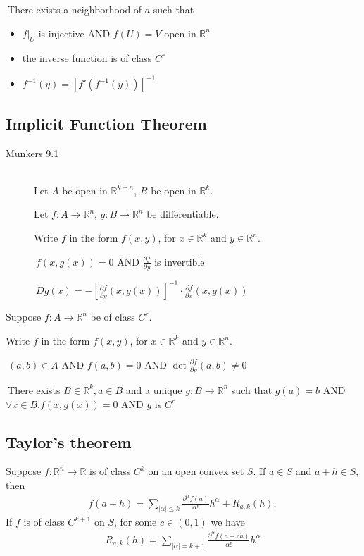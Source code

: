 \thmTHEN
	$\ $There exists a neighborhood of $a$ such that
\begin{itemize}
	\item $f|_U$ is injective AND $f(U)=V$ open in $\mathbb{R}^n$
	\item the inverse function is of class $C^r$
	\item $f^{-1}(y)=[f'(f^{-1}(y))]^{-1}$
\end{itemize}


\subsection{Implicit Function Theorem}
\label{thm_ipft}
\begin{description}
	\item[Munkers 9.1] \hfill \\
		Let $A$ be open in $\mathbb{R}^{k+n}$, $B$ be open in $\mathbb{R}^k$.

		Let $f:A\to \mathbb{R}^n$, $g:B\to \mathbb{R}^n$ be differentiable.

		Write $f$ in the form $f(x, y)$, for $x\in \mathbb{R}^k$ and $y\in \mathbb{R}^n$.

		\thmIF $\ f(x, g(x))=0$ AND $\frac{\partial f}{\partial y}$ is invertible

		\thmTHEN $\ Dg(x)=-\left[\frac{\partial f}{\partial y}(x,g(x))\right]^{-1}\cdot \frac{\partial f}{\partial x}(x,g(x))$
\end{description}

Suppose $f:A\to \mathbb{R}^n$ be of class $C^r$.

Write $f$ in the form $f(x, y)$, for $x\in \mathbb{R}^k$ and $y\in \mathbb{R}^n$.

\thmIF $\ (a, b)\in A$ AND $f(a, b)=0$ AND $\det \frac{\partial f}{\partial y}(a,b)\neq 0$

\thmTHEN $\ $There exists $B\in \mathbb{R}^k, a \in B$ and a unique $g:B\to \mathbb{R}^n$ such that
		$g(a)=b$ AND $\forall x\in B. f(x,g(x))=0$ AND $g$ is $C^r$

\subsection{Taylor’s theorem}
\label{thm:taylor}
Suppose $f:\mathbb{R}^n \to \mathbb{R}$ is of class $C^k$ on an open convex set $S$. If $a \in S$ and $a+h \in S$, then
\begin{align*}
f(a+h) = \sum\limits_{|\alpha| \leq k} \frac{\partial^\alpha f(a)}{\alpha!}h^\alpha + R_{a,k}(h),
\end{align*}
If $f$ is of class $C^{k+1}$ on $S$, for some $c \in (0, 1)$ we have
\begin{align*}
 R_{a,k}(h) = \sum\limits_{|\alpha| = k+1} \frac{\partial^\alpha f(a+ch)}{\alpha!}h^\alpha
\end{align*}